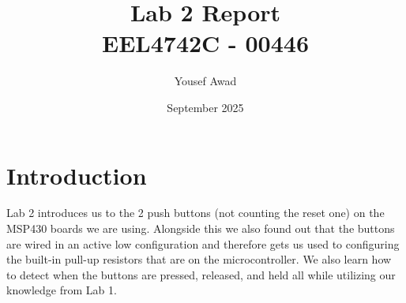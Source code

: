 \documentclass{article}
\title{Lab 2 Report \\ \large EEL4742C - 00446}
\author{Yousef Awad}
\date{September 2025}
\begin{document}
\maketitle
\tableofcontents
\newpage

\section{Introduction}
Lab 2 introduces us to the 2 push buttons (not counting the reset one) on the MSP430 boards we are using. Alongside this we also found out that the buttons are wired in an active low configuration and therefore gets us used to configuring the built-in pull-up resistors that are on the microcontroller. We also learn how to detect when the buttons are pressed, released, and held all while utilizing our knowledge from Lab 1.
\end{document}
